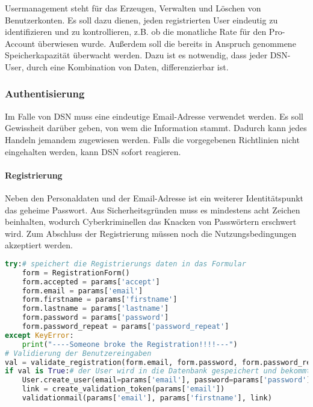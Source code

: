 
Usermanagement steht für das Erzeugen, Verwalten und Löschen von Benutzerkonten. Es soll dazu dienen, jeden registrierten User eindeutig zu identifizieren und zu kontrollieren, z.B. ob die monatliche Rate für den Pro-Account überwiesen wurde. Außerdem soll die bereits in Anspruch genommene Speicherkapazität überwacht werden. Dazu ist es notwendig, dass jeder DSN-User, durch eine Kombination von Daten, differenzierbar ist.
\subsubsection{Authentisierung}
Im Falle von DSN muss eine eindeutige Email-Adresse verwendet werden. Es soll Gewissheit darüber geben, von wem die Information stammt. Dadurch kann jedes Handeln jemandem zugewiesen werden. Falls die vorgegebenen Richtlinien nicht eingehalten werden, kann DSN sofort reagieren.
\paragraph{Registrierung}
Neben den Personaldaten und der Email-Adresse ist ein weiterer Identitätspunkt das geheime Passwort. Aus Sicherheitsgründen muss es mindestens acht Zeichen beinhalten, wodurch Cyberkriminellen das Knacken von Passwörtern erschwert wird. Zum Abschluss der Registrierung müssen noch die Nutzungsbedingungen akzeptiert werden.

\begin{lstlisting}[caption={Session Timeout}, language=Python]
try:# speichert die Registrierungs daten in das Formular
	form = RegistrationForm()
	form.accepted = params['accept']
	form.email = params['email']
	form.firstname = params['firstname']
	form.lastname = params['lastname']
	form.password = params['password']
	form.password_repeat = params['password_repeat']
except KeyError:
	print("----Someone broke the Registration!!!!---")
# Validierung der Benutzereingaben
val = validate_registration(form.email, form.password, form.password_repeat, params['recaptcha'],get_ip(request))
if val is True:# der User wird in die Datenbank gespeichert und bekommt anschliessend eine Bestaetigungsmail
	User.create_user(email=params['email'], password=params['password'], first_name=params['firstname'], last_name=params['lastname'])
	link = create_validation_token(params['email'])
	validationmail(params['email'], params['firstname'], link)
\end{lstlisting}

